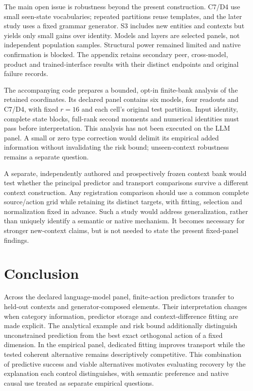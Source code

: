 \documentclass{article}
\begin{document}
The main open issue is robustness beyond the present construction. C7/D4 use small seen-state vocabularies; repeated partitions reuse templates, and the later study uses a fixed grammar generator. S3 includes new entities and contexts but yields only small gains over identity. Models and layers are selected panels, not independent population samples. Structural power remained limited and native confirmation is blocked. The appendix retains secondary peer, cross-model, product and trained-interface results with their distinct endpoints and original failure records.

The accompanying code prepares a bounded, opt-in finite-bank analysis of the retained coordinates. Its declared panel contains six models, four readouts and C7/D4, with fixed $r=16$ and each cell's original test partition. Input identity, complete state blocks, full-rank second moments and numerical identities must pass before interpretation. This analysis has not been executed on the LLM panel. A small or zero type correction would delimit its empirical added information without invalidating the risk bound; unseen-context robustness remains a separate question.

A separate, independently authored and prospectively frozen context bank would test whether the principal predictor and transport comparisons survive a different context construction. Any registration comparison should use a common complete source/action grid while retaining its distinct targets, with fitting, selection and normalization fixed in advance. Such a study would address generalization, rather than uniquely identify a semantic or native mechanism. It becomes necessary for stronger new-context claims, but is not needed to state the present fixed-panel findings.

\section{Conclusion}
Across the declared language-model panel, finite-action predictors transfer to held-out contexts and generator-composed elements. Their interpretation changes when category information, predictor storage and context-difference fitting are made explicit. The analytical example and risk bound additionally distinguish unconstrained prediction from the best exact orthogonal action of a fixed dimension. In the empirical panel, dedicated fitting improves transport while the tested coherent alternative remains descriptively competitive. This combination of predictive success and viable alternatives motivates evaluating recovery by the explanation each control distinguishes, with semantic preference and native causal use treated as separate empirical questions.
\end{document}
